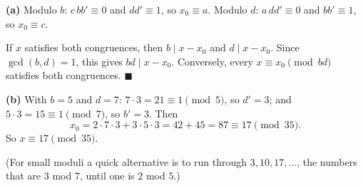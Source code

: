 \textbf{(a)} Modulo $b$: $c\,bb'\equiv0$ and $dd'\equiv1$, so $x_0\equiv a$. Modulo $d$: $a\,dd'\equiv0$ and $bb'\equiv1$, so $x_0\equiv c$.

If $x$ satisfies both congruences, then $b\mid x-x_0$ and $d\mid x-x_0$. Since $\gcd(b,d)=1$, this gives $bd\mid x-x_0$. Conversely, every $x\equiv x_0\pmod{bd}$ satisfies both congruences. $\blacksquare$

\textbf{(b)} With $b=5$ and $d=7$: $7\cdot3=21\equiv1\pmod5$, so $d'=3$; and $5\cdot3=15\equiv1\pmod7$, so $b'=3$. Then
\[x_0=2\cdot7\cdot3+3\cdot5\cdot3=42+45=87\equiv17\pmod{35}.\]
So $x\equiv\boxed{17}\pmod{35}$.

(For small moduli a quick alternative is to run through $3,10,17,\dots$, the numbers that are $3$ mod $7$, until one is $2$ mod $5$.)
